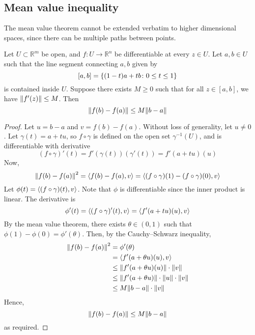 \subsection{Mean value inequality}
The mean value theorem cannot be extended verbatim to higher dimensional spaces, since there can be multiple paths between points.
\begin{theorem}
	Let \( U \subset \mathbb R^m \) be open, and \( f \colon U \to \mathbb R^n \) be differentiable at every \( z \in U \).
	Let \( a, b \in U \) such that the line segment connecting \( a,b \) given by
	\[
		[a,b] = \qty{(1-t)a + tb \colon 0 \leq t \leq 1}
	\]
	is contained inside \( U \).
	Suppose there exists \( M \geq 0 \) such that for all \( z \in [a,b] \), we have \( \norm{f'(z)} \leq M \).
	Then
	\[
		\norm{f(b) - f(a)} \leq M \norm{b-a}
	\]
\end{theorem}
\begin{proof}
	Let \( u = b - a \) and \( v = f(b) - f(a) \).
	Without loss of generality, let \( u \neq 0 \).
	Let \( \gamma(t) = a + tu \), so \( f \circ \gamma \) is defined on the open set \( \gamma^{-1}(U) \), and is differentiable with derivative
	\[
		(f \circ \gamma)'(t) = f'(\gamma(t))(\gamma'(t)) = f'(a+tu)(u)
	\]
	Now,
	\[
		\norm{f(b) - f(a)}^2 = \left\langle{f(b) - f(a), v}\right\rangle = \left\langle{(f \circ \gamma)(1) - (f \circ \gamma)(0), v}\right\rangle
	\]
	Let \( \phi(t) = \left\langle{(f \circ \gamma)(t), v}\right\rangle \).
	Note that \( \phi \) is differentiable since the inner product is linear.
	The derivative is
	\[
		\phi'(t) = \left\langle{(f \circ \gamma)'(t), v}\right\rangle = \left\langle{f'(a+tu)(u), v}\right\rangle
	\]
	By the mean value theorem, there exists \( \theta \in (0,1) \) such that \( \phi(1) - \phi(0) = \phi'(\theta) \).
	Then, by the Cauchy--Schwarz inequality,
	\begin{align*}
		\norm{f(b) - f(a)}^2 &= \phi'(\theta) \\
		&= \left\langle{f'(a+\theta u)(u), v}\right\rangle \\
		&\leq \norm{f'(a+\theta u)(u)} \cdot \norm{v} \\
		&\leq \norm{f'(a+\theta u)} \cdot \norm{u} \cdot \norm{v} \\
		&\leq M \norm{b-a} \cdot \norm{v}
	\end{align*}
	Hence,
	\[
		\norm{f(b) - f(a)} \leq M \norm{b-a}
	\]
	as required.
\end{proof}

